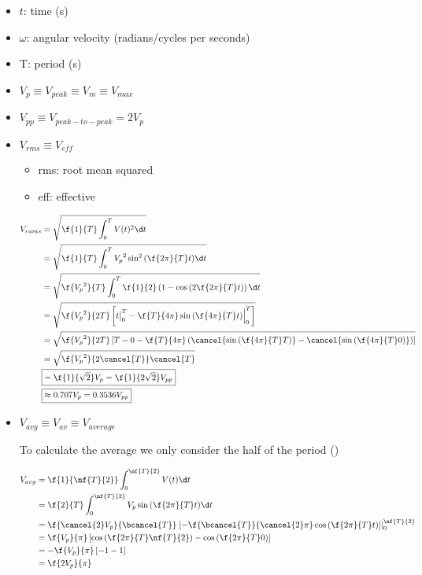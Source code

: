 \begin{itemize}
  \item \(t\): time (s)
  \item \(\omega\): angular velocity (radians/cycles per seconds)
  \item T: period (s)
  \item \(V_p \equiv V_{peak} \equiv V_{m} \equiv V_{max}\)
  \item \(V_{pp} \equiv V_{peak-to-peak} = 2 V_p\)
  \item \(V_{rms} \equiv V_{eff}\)
    \begin{itemize}
      \item rms: root mean squared
      \item eff: effective
    \end{itemize}

    \begin{align*}
      V_{rams} &= \sqrt{ \f{1}{T} \int_0^T{ V(t)^2 \d t } } \\
              &= \sqrt{ \f{1}{T} \int_0^T{ {V_p}^2 \sin^2{\left(\f{2\pi}{T}t\right)} \d t } } \\
              &= \sqrt{ \f{{V_p}^2}{T} \int_0^T{\f{1}{2} \left( 1 - \cos{\left(2 \f{2\pi}{T} t\right)} \right) \d t} } \\
              &= \sqrt{ \f{{V_p}^2}{2T} \left[ t \bigr\vert_{0}^T - \f{T}{4\pi} \sin{ \left( \f{4\pi}{T} t \right) } \Big\rvert_0^T \right] } \\
              &= \sqrt{ \f{{V_p}^2}{2T}
                \left[
                        T - 0
                        - \f{T}{4\pi} \left( \cancel{\sin{\left(\f{4\pi}{T}T\right)}} - \cancel{\sin{\left(\f{4\pi}{T}0\right)}} \right)
                \right]
              } \\
              &= \sqrt{ \f{{V_p}^2}{2\cancel{T}} \cancel{T} } \\
              &\boxed{= \f{1}{\sqrt{2}} V_p = \f{1}{2\sqrt{2}} V_{pp}} \\
              &\boxed{\approx 0.707 V_p = 0.3536 V_{pp}}
    \end{align*}

  \item \(V_{avg} \equiv  V_{av} \equiv V_{average}\)

    To calculate the average we only consider the half of the period ()

    \begin{align*}
      V_{avg} &= \f{1}{\nf{T}{2}} \int_0^{\nf{T}{2}}{V(t)} \d t\\
              &= \f{2}{T} \int_0^{\nf{T}{2}}{V_p \sin{\left(\f{2\pi}{T} t\right)}} \d t \\
              &= \f{\cancel{2}V_p}{\bcancel{T}} \left.\left[-\f{\bcancel{T}}{\cancel{2}\pi}\cos{\left(\f{2\pi}{T} t\right)}\right]\right\vert_0^{\nf{T}{2}} \\
              &= \f{V_p}{\pi} \left[\cos{\left(\f{2\pi}{T} \nf{T}{2}\right)} - \cos{\left(\f{2\pi}{T} 0\right)}\right] \\
              &= -\f{V_p}{\pi} \left[-1 - 1\right] \\
              &= \f{2V_p}{\pi} \\
    \end{align*}



\end{itemize}
